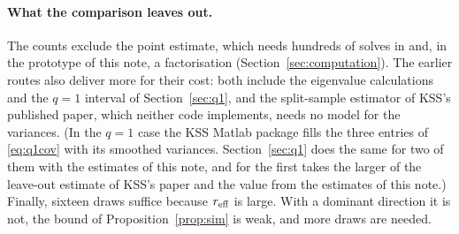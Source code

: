 \paragraph{What the comparison leaves out.} The counts exclude the point estimate, which needs hundreds of
solves in \fevc{} and, in the prototype of this note, a factorisation (Section~\ref{sec:computation}). The earlier
routes also deliver more for their cost: both include the eigenvalue calculations and the $q=1$ interval of
Section~\ref{sec:q1}, and the split-sample estimator of KSS's published paper, which neither code implements, needs no model
for the variances. (In the $q=1$ case the KSS Matlab package fills the three entries of \eqref{eq:q1cov} with
its smoothed variances. Section~\ref{sec:q1} does the same for two of them with the estimates of this note, and
for the first takes the larger of the leave-out estimate of KSS's paper and the value from the estimates of
this note.) Finally, sixteen draws suffice
because $r_{\rm eff}$ is large. With a dominant direction it is not, the bound of Proposition~\ref{prop:sim}
is weak, and more draws are needed.
